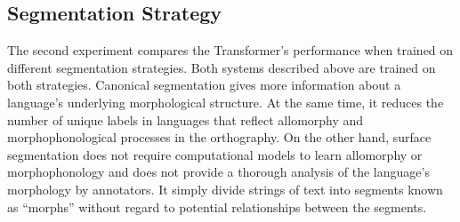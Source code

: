


\subsection{Segmentation Strategy}
\label{sec:strategies}

The second experiment compares the Transformer's performance when trained on different segmentation strategies. Both systems described above are trained on both strategies. Canonical segmentation gives more information about a language's underlying morphological structure. At the same time, it reduces the number of unique labels in languages that reflect allomorphy and morphophonological processes in the orthography. On the other hand, surface segmentation does not require computational models to learn allomorphy or morphophonology \citep{goldsmith_computational_2017} and does not provide a thorough analysis of the language's morphology by annotators. It simply divide strings of text into segments known as ``morphs'' \citep{virpioja_empirical_2011} without regard to potential relationships between the segments. 

